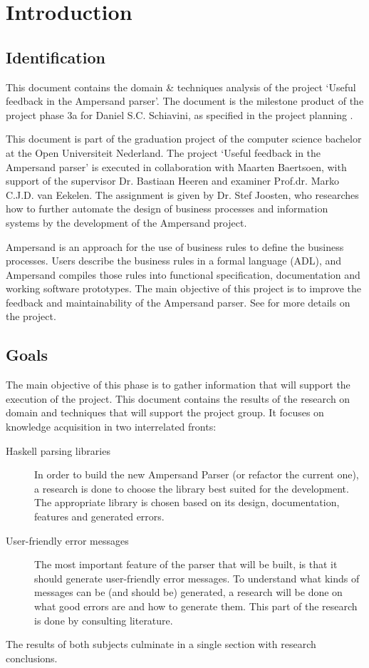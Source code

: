 \section{Introduction}
\subsection{Identification}
This document contains the domain \& techniques analysis of the project `Useful feedback in the Ampersand parser'.
The document is the milestone product of the project phase 3a for Daniel S.C. Schiavini, as specified in the project planning \cite{plan}.

This document is part of the graduation project of the computer science bachelor at the Open Universiteit Nederland.
The project `Useful feedback in the Ampersand parser' is executed in collaboration with Maarten Baertsoen, with support of the supervisor Dr. Bastiaan Heeren and examiner Prof.dr. Marko C.J.D. van Eekelen.
The assignment is given by Dr. Stef Joosten, who researches how to further automate the design of business processes and information systems by the development of the Ampersand project.

Ampersand is an approach for the use of business rules to define the business processes.
Users describe the business rules in a formal language (ADL), and Ampersand compiles those rules into functional specification, documentation and working software
prototypes.
The main objective of this project is to improve the feedback and maintainability of the Ampersand parser.
See \cite{plan} for more details on the project.

\subsection{Goals}
The main objective of this phase is to gather information that will support the execution of the project.
This document contains the results of the research on domain and techniques that will support the project group.
It focuses on knowledge acquisition in two interrelated fronts:
\begin{description}
	\item[Haskell parsing libraries]
	In order to build the new Ampersand Parser (or refactor the current one), a research is done to choose the library best suited for the development.
	The appropriate library is chosen based on its design, documentation, features and generated errors.
	
	\item[User-friendly error messages]
	The most important feature of the parser that will be built, is that it should generate user-friendly error messages.
	To understand what kinds of messages can be (and should be) generated, a research will be done on what good errors are and how to generate them.
	This part of the research is done by consulting literature.
\end{description}
%
The results of both subjects culminate in a single section with research conclusions.

